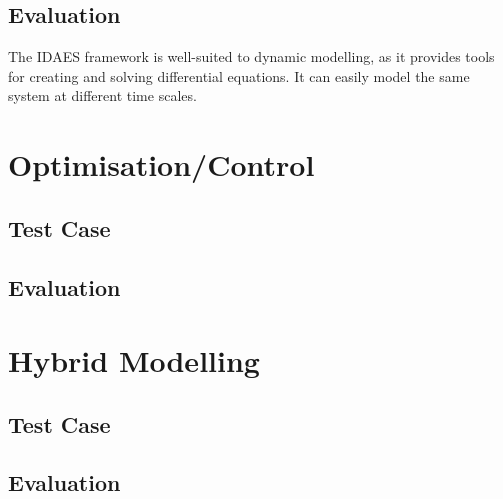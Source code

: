 \documentclass[12pt]{article}
\begin{document}
\subsection{Evaluation}
The IDAES framework is well-suited to dynamic modelling, as it provides tools for creating and solving differential equations. It can easily model the same system at different time scales.

\section{Optimisation/Control}

\subsection{Test Case}




\subsection{Evaluation}


\section{Hybrid Modelling}

\subsection{Test Case}





\subsection{Evaluation}


\end{document}

